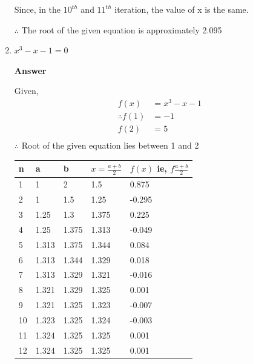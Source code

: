 \documentclass[11pt, a4paper, oneside]{book}
\begin{document}
\begin{enumerate}
            Since, in the $10^{th}$ and $11^{th}$ iteration, the value of x is the same.

            $\therefore$ The root of the given equation is approximately 2.095

            \item $x^3-x-1=0$

              \textbf{Answer}

                  Given,
                  \begin{align*}
                    f(x)&=x^3-x-1\\
                    \therefore f(1)&=-1\\
                    f(2)&=5\\
                  \end{align*}
                  $\therefore$ Root of the given equation lies between 1 and 2
                  \Large
                  \begin{center}
                  \begin{tabular}{|l|l|l|l|l|}
                    \hline
                    n  & a     & b     & $x=\frac{a+b}{2}$ & $f(x)$ ie, $f\frac{a+b}{2}$ \\ \hline
                    1  & 1     & 2     & 1.5               & 0.875                       \\ \hline
                    2  & 1     & 1.5   & 1.25              & -0.295                      \\ \hline
                    3  & 1.25  & 1.3   & 1.375             & 0.225                       \\ \hline
                    4  & 1.25  & 1.375 & 1.313             & -0.049                      \\ \hline
                    5  & 1.313 & 1.375 & 1.344             & 0.084                       \\ \hline
                    6  & 1.313 & 1.344 & 1.329             & 0.018                       \\ \hline
                    7  & 1.313 & 1.329 & 1.321             & -0.016                      \\ \hline
                    8  & 1.321 & 1.329 & 1.325             & 0.001                       \\ \hline
                    9  & 1.321 & 1.325 & 1.323             & -0.007                      \\ \hline
                    10 & 1.323 & 1.325 & 1.324             & -0.003                      \\ \hline
                    11 & 1.324 & 1.325 & 1.325             & 0.001                       \\ \hline
                    12 & 1.324 & 1.325 & 1.325             & 0.001                       \\ \hline
                  \end{tabular}
                  \end{center}
                  \normalsize


\end{enumerate}
\end{document}
